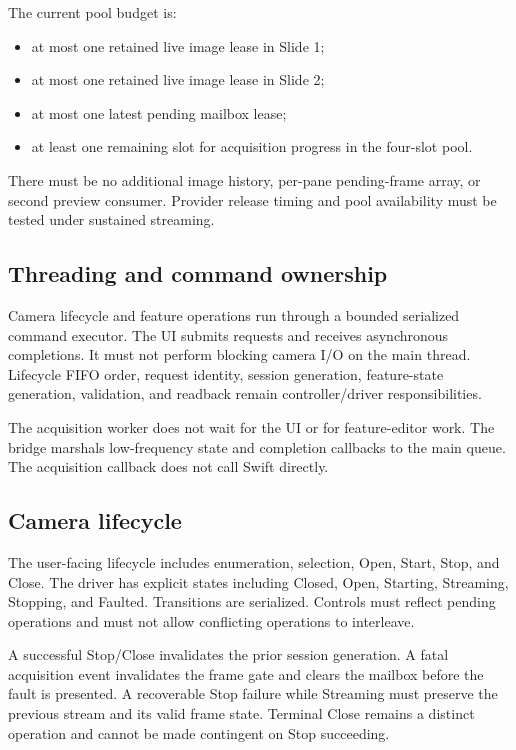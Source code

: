\documentclass[11pt,a4paper,oneside]{article}
\begin{document}
The current pool budget is:
\begin{itemize}
  \item at most one retained live image lease in Slide 1;
  \item at most one retained live image lease in Slide 2;
  \item at most one latest pending mailbox lease;
  \item at least one remaining slot for acquisition progress in the four-slot pool.
\end{itemize}
There must be no additional image history, per-pane pending-frame array, or second preview consumer. Provider release timing and pool availability must be tested under sustained streaming.

\subsection{Threading and command ownership}
Camera lifecycle and feature operations run through a bounded serialized command executor. The UI submits requests and receives asynchronous completions. It must not perform blocking camera I/O on the main thread. Lifecycle FIFO order, request identity, session generation, feature-state generation, validation, and readback remain controller/driver responsibilities.

The acquisition worker does not wait for the UI or for feature-editor work. The bridge marshals low-frequency state and completion callbacks to the main queue. The acquisition callback does not call Swift directly.

\subsection{Camera lifecycle}
The user-facing lifecycle includes enumeration, selection, Open, Start, Stop, and Close. The driver has explicit states including Closed, Open, Starting, Streaming, Stopping, and Faulted. Transitions are serialized. Controls must reflect pending operations and must not allow conflicting operations to interleave.

A successful Stop/Close invalidates the prior session generation. A fatal acquisition event invalidates the frame gate and clears the mailbox before the fault is presented. A recoverable Stop failure while Streaming must preserve the previous stream and its valid frame state. Terminal Close remains a distinct operation and cannot be made contingent on Stop succeeding.
\end{document}
